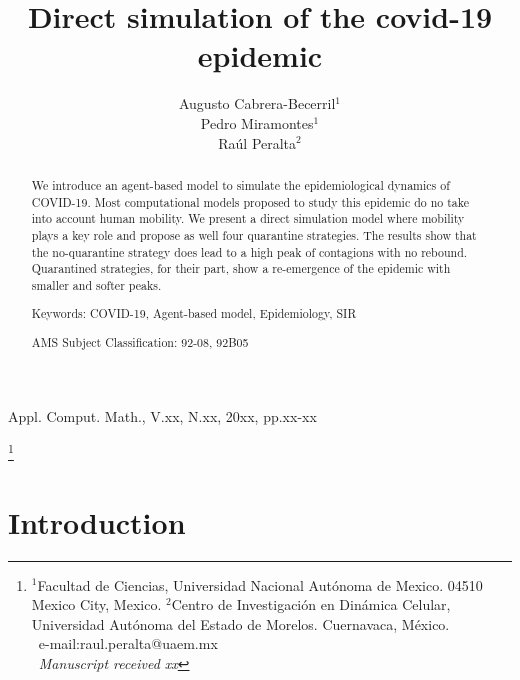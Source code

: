 \documentclass[11pt,a4paper,reqno]{amsart}
\theoremstyle{definition}
\theoremstyle{remark}
\begin{document}
\setcounter{page}{1}
\begin{flushleft}
{\scriptsize Appl. Comput. Math., V.xx, N.xx, 20xx, pp.xx-xx}
\end{flushleft}
\bigskip
\bigskip
\title[Direct simulation of... ] { Direct simulation of the covid-19 epidemic}
\author[Appl. Comput. Math., V.xx, N.xx,  20xx]{Augusto Cabrera-Becerril$^1$\\
Pedro Miramontes$^1$\\ Raúl Peralta$^2$
 }
\thanks{$^1$Facultad de Ciencias, Universidad Nacional Autónoma de Mexico. 04510 Mexico City, Mexico. $^2$Centro de Investigación en Dinámica Celular, Universidad Autónoma del Estado de Morelos. Cuernavaca, México.
\\ \indent\,\,\,e-mail:raul.peralta@uaem.mx 
\\ \indent
  \em \,\,\,Manuscript received xx}

\begin{abstract}

We introduce an agent-based model to simulate the epidemiological dynamics of COVID-19. Most computational models proposed to study this epidemic do no take into account human mobility. We present a direct simulation model where mobility plays a key role and propose as well four quarantine strategies. The results show that the no-quarantine strategy does lead to a high peak of contagions with no rebound. Quarantined strategies, for their part, show a re-emergence of the epidemic with smaller and softer peaks.

\bigskip
\noindent Keywords: COVID-19, Agent-based model, Epidemiology, SIR


\bigskip \noindent AMS Subject Classification: 92-08, 92B05

\end{abstract}
\maketitle

\smallskip
\section{Introduction}
\end{document}
